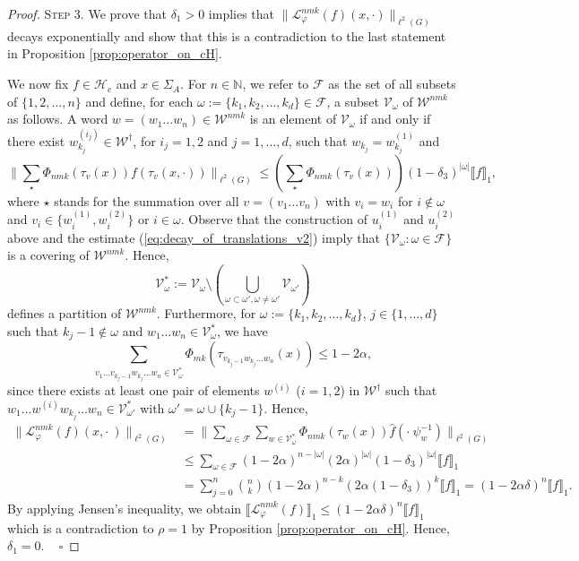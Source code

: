 \documentclass[10pt]{article}
\theoremstyle{mystyle}
\newcommand{\N}{\mathbb{N}}
\newcommand{\cF}{\mathcal{F}}
\newcommand{\cW}{\mathcal{W}}
\newcommand{\cL}{\mathcal{L}}
\newcommand{\cH}{\mathcal{H}}
\newcommand{\cV}{\mathcal{V}}
\newcommand{\Sig}{{\Sigma}}
\newcommand{\1}{\mathbf{1}}
\newcommand{\with}{:}
\begin{document}
\begin{proof}
\noindent \textsc{Step 3}. We  prove that $\delta_1>0$ implies that $\|\cL_\varphi^{nmk}(f)(x,\cdot )\|_{\ell^2(G)}$ decays exponentially and show that this is a contradiction to the last statement in Proposition \ref{prop:operator_on_cH}.

We now fix $f \in \cH_c$ and $x \in \Sig_A$. For $n \in \N$, we refer to $\cF$ as the set of all subsets of $\{1,2,\ldots, n\}$ and define, for each $\omega:= \{k_1, k_2,\ldots, k_d\} \in \cF$, a subset $\cV_\omega$ of $\cW^{nmk}$  as follows. A word $w=(w_1\ldots w_n) \in \cW^{nmk}$ is an element of $\cV_\omega$ if and only if there exist $w^{(i_j)}_{k_j} \in \cW^\dagger$, for $i_j=1,2$ and $j=1, \ldots,d$, such that $w_{k_j}= w^{(1)}_{k_j}$ and
\[ \big\|  \sum_{\star} \Phi_{nmk}(\tau_{v}(x)) f(\tau_{v}(x,\cdot)) \big\|_{\ell^2(G)} \leq \left( \sum_{\star} \Phi_{nmk}(\tau_{v}(x)) \right) (1-\delta_3)^{|\omega|} \llbracket f \rrbracket_1,
\]
where $\star$ stands for the summation over all $v = (v_1\ldots v_n)$ with $v_i = w_i$ for $i \notin \omega$ and 
$v_i \in \{w_i^{(1)},w_i^{(2)}\}$ or $i \in \omega$. Observe that the construction of $u_{i}^{(1)}$ and $u_{i}^{(2)}$ above and the estimate (\ref{eq:decay_of_translations_v2}) imply that $\{\cV_\omega \with \omega \in \cF\}$ is a covering of $\cW^{nmk}$. Hence,
\[ \cV^\ast_\omega := \cV_\omega\setminus\left({\textstyle \bigcup_{\omega \subset \omega', \omega \neq \omega'} \cV_{\omega'}}  \right) \]
defines a partition of $\cW^{nmk}$. Furthermore, for $\omega:= \{k_1, k_2,\ldots, k_d\}$, $j \in \{1,\ldots,d\}$ such that $k_j -1 \notin \omega$ and $w_1 \ldots w_n \in \cV^\ast_\omega$, we have
\[\sum_{v_1 \ldots v_{k_j -1} w_{k_j} \ldots w_n \in \cV^\ast_\omega} \Phi_{mk}(\tau_{v_{k_j -1}w_{k_j} \ldots w_n}(x)) \leq 1 - 2\alpha,\]
since there exists at least one pair of elements $w^{(i)}$ ($i=1,2$) in $\cW^\dagger$ such that $w_1\ldots w^{(i)}w_{k_j} \ldots w_n \in \cV^\ast_{\omega'}$ with $\omega' = \omega \cup \{k_j -1\}$. Hence, 
\begin{align*}
\| \cL_\varphi^{nmk}(f)(x,\cdot\ )\|_{\ell^2(G)} & = \big\| \sum_{\omega \in \cF} \sum_{w \in \cV^\ast_\omega} \Phi_{{nmk}}(\tau_w(x)) \hat{f}(\cdot \ \psi_w^{-1}) \big\|_{\ell^2(G)} \\
& \leq  \sum_{\omega \in \cF} (1-2\alpha)^{n-|\omega|} (2\alpha)^{|\omega|} (1-\delta_3)^{|\omega|}  \llbracket f \rrbracket_1 \\
& = \sum_{j=0}^n \genfrac{(}{)}{0pt}{}{n}{k} (1-2\alpha)^{n-k}  (2\alpha(1-\delta_3))^{k} \llbracket f \rrbracket_1= (1 - 2\alpha \delta)^n \llbracket f \rrbracket_1.
 \end{align*}
By applying Jensen's inequality, we obtain $\llbracket \cL_\varphi^{nmk}(f)\rrbracket_1 \leq (1 - 2\alpha \delta)^n \llbracket f \rrbracket_1$ which is a contradiction to $\rho=1$ by Proposition \ref{prop:operator_on_cH}. Hence, $\delta_1=0$. 
~ \hfill $\square$ \end{proof}
\end{document}
